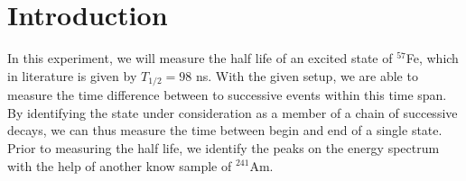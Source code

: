 \section{Introduction}
In this experiment, we will measure the half life of an excited state of 
$^{57}$Fe, which in literature is given by $T_{1/2} = 98$ ns. With the given setup, 
we are able to measure the time difference between to successive events within this 
time span. By identifying the state under consideration as a member of a chain of successive decays, 
we can thus measure the time between begin and end of a single state. 
Prior to measuring the half life, we identify the peaks on the energy spectrum 
with the help of another know sample of $^{241}$Am. 


